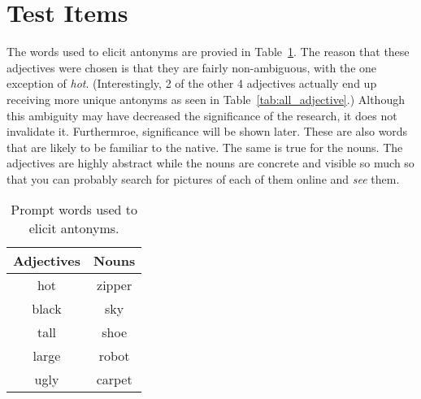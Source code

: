 \section{Test Items}
The words used to elicit antonyms are provied in Table~\ref{tab:key-words}.  The reason that these adjectives were chosen is that they are fairly non-ambiguous, with the one exception of \textit{hot}.  (Interestingly, 2 of the other 4 adjectives actually end up receiving more unique antonyms as seen in Table~\ref{tab:all_adjective}.) Although this ambiguity may have decreased the significance of the research, it does not invalidate it.  Furthermroe, significance will be shown later. These are also words that are likely to be familiar to the native.  The same is true for the nouns.  The adjectives are highly abstract while the nouns are concrete and visible so much so that you can probably search for pictures of each of them online and \textit{see} them.   

\begin{table}
	\begin{center}
		\begin{tabular}{|c|c|}	\hline
			\textbf{Adjectives} & \textbf{Nouns} 	\\ \hline
			hot					&  zipper 			\\ \hline
			black				&  sky				\\ \hline
			tall				&  shoe				\\ \hline
			large				&  robot			\\ \hline
			ugly				&  carpet			\\ \hline
		\end{tabular}
	\end{center}
	\caption{Prompt words used to elicit antonyms.}
	\label{tab:key-words}
\end{table}
